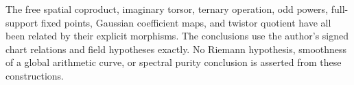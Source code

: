 The free spatial coproduct, imaginary torsor, ternary operation,
odd powers, full-support fixed points, Gaussian coefficient maps,
and twistor quotient have all been related by their explicit
morphisms. The conclusions use the author's signed chart relations
and field hypotheses exactly. No Riemann hypothesis, smoothness
of a global arithmetic curve, or spectral purity conclusion is
asserted from these constructions.

